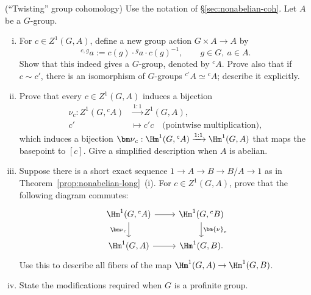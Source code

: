 \begin{Exercises}
	\item (``Twisting'' group cohomology) Use the notation of
	\S\ref{sec:nonabelian-coh}. Let $A$ be a $G$-group.
	\begin{enumerate}[(i)]
		\item For $c\in Z^1(G,A)$, define a new group action $G\times A\to A$
		by
		\[ {}^{c,g}a:=c(g)\cdot{}^ga\cdot c(g)^{-1},
		\qquad g\in G,\ a\in A. \]
		Show that this indeed gives a $G$-group, denoted by ${}^cA$. Prove
		also that if $c\sim c'$, there is an isomorphism of $G$-groups
		${}^{c'}A\simeq{}^cA$; describe it explicitly.
		\item Prove that every $c\in Z^1(G,A)$ induces a bijection
		\begin{align*}
			\nu_c:Z^1(G,{}^cA)&\xrightarrow{1:1}Z^1(G,A),\\
			c'&\longmapsto c'c\quad\text{(pointwise multiplication)},
		\end{align*}
		which induces a bijection
		${\bm\nu}_c:\Hm^1(G,{}^cA)\xrightarrow{1:1}\Hm^1(G,A)$ that maps the
		basepoint to $[c]$. Give a simplified description when $A$ is abelian.
		\item Suppose there is a short exact sequence
		$1\to A\to B\to B/A\to1$ as in
		Theorem~\ref{prop:nonabelian-long}~(i). For $c\in Z^1(G,A)$, prove
		that the following diagram commutes:
		\[\begin{tikzcd}
			\Hm^1(G,{}^cA) \arrow[r] \arrow[d,"{{\bm\nu}_c}"'] &
			\Hm^1(G,{}^cB) \arrow[d,"{\bm{\nu}_c}"]\\
			\Hm^1(G,A) \arrow[r] & \Hm^1(G,B).
		\end{tikzcd}\]
		Use this to describe all fibers of the map
		$\Hm^1(G,A)\to\Hm^1(G,B)$.
		\item State the modifications required when $G$ is a profinite group.
	\end{enumerate}
\end{Exercises}
